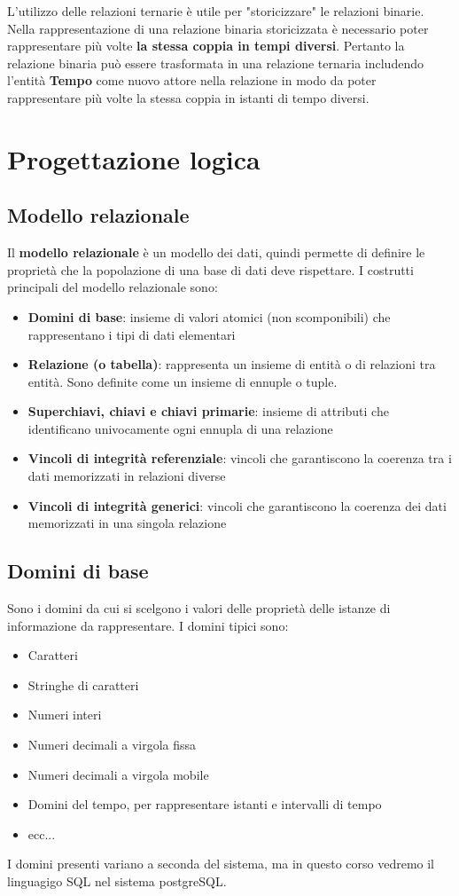 \documentclass[a4paper,twoside]{article}
\begin{document}
\vspace{1em}
\noindent
L'utilizzo delle relazioni ternarie è utile per "storicizzare" le relazioni binarie.
Nella rappresentazione di una relazione binaria storicizzata è necessario poter rappresentare
più volte \textbf{la stessa coppia in tempi diversi}. Pertanto la relazione binaria può
essere trasformata in una relazione ternaria includendo l'entità \textbf{Tempo} come
nuovo attore nella relazione in modo da poter rappresentare più volte la stessa coppia
in istanti di tempo diversi.

\section{Progettazione logica}
\subsection{Modello relazionale}
Il \textbf{modello relazionale} è un modello dei dati, quindi permette di definire le proprietà
che la popolazione di una base di dati deve rispettare. I costrutti principali del
modello relazionale sono:
\begin{itemize}
  \item \textbf{Domini di base}: insieme di valori atomici (non scomponibili) che
    rappresentano i tipi di dati elementari
  \item \textbf{Relazione (o tabella)}: rappresenta un insieme di entità o di relazioni
    tra entità. Sono definite come un insieme di ennuple o tuple.
  \item \textbf{Superchiavi, chiavi e chiavi primarie}: insieme di attributi che identificano
    univocamente ogni ennupla di una relazione
  \item \textbf{Vincoli di integrità referenziale}: vincoli che garantiscono la coerenza tra
    i dati memorizzati in relazioni diverse
  \item \textbf{Vincoli di integrità generici}: vincoli che garantiscono la coerenza dei dati
    memorizzati in una singola relazione
\end{itemize}

\subsection{Domini di base}
Sono i domini da cui si scelgono i valori delle proprietà delle istanze di informazione da
rappresentare. I domini tipici sono:
\begin{itemize}
  \item Caratteri
  \item Stringhe di caratteri
  \item Numeri interi
  \item Numeri decimali a virgola fissa
  \item Numeri decimali a virgola mobile
  \item Domini del tempo, per rappresentare istanti e intervalli di tempo
  \item ecc...
\end{itemize}
I domini presenti variano a seconda del sistema, ma in questo corso vedremo il linguagigo
SQL nel sistema postgreSQL.
\end{document}
